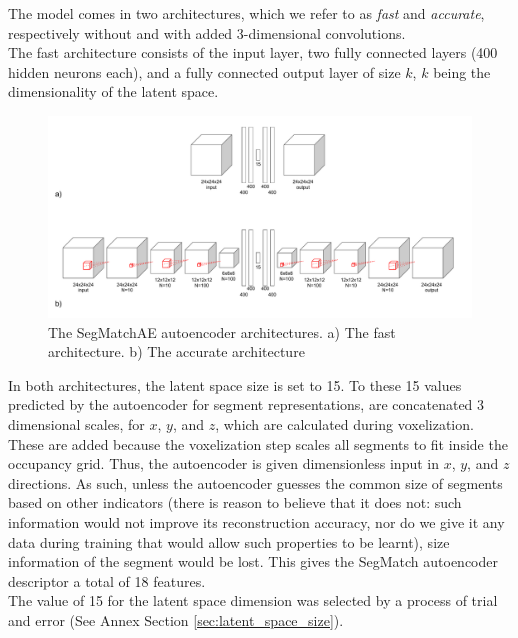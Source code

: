 The model comes in two architectures, which we refer to as \textit{fast} and \textit{accurate}, respectively without and with added 3-dimensional convolutions.\\

The fast architecture consists of the input layer, two fully connected layers (400 hidden neurons each), and a fully connected output layer of size $k$, $k$ being the dimensionality of the latent space.

\begin{figure}
  \centering
  \includegraphics[width=5.2in]{images/architecture.pdf}
  \caption{The SegMatchAE autoencoder architectures. a) The fast architecture. b) The accurate architecture}
  \label{fig:architecture}
\end{figure}

In both architectures, the latent space size is set to 15. To these 15 values predicted by the autoencoder for segment representations, are concatenated 3 dimensional scales, for $x$, $y$, and $z$, which are calculated during voxelization. These are added because the voxelization step scales all segments to fit inside the occupancy grid. Thus, the autoencoder is given dimensionless input in $x$, $y$, and $z$ directions. As such, unless the autoencoder guesses the common size of segments based on other indicators (there is reason to believe that it does not: such information would not improve its reconstruction accuracy, nor do we give it any data during training that would allow such properties to be learnt), size information of the segment would be lost. This gives the SegMatch autoencoder descriptor a total of 18 features.\\

The value of 15 for the latent space dimension was selected by a process of trial and error (See Annex Section \ref{sec:latent_space_size}).\\

